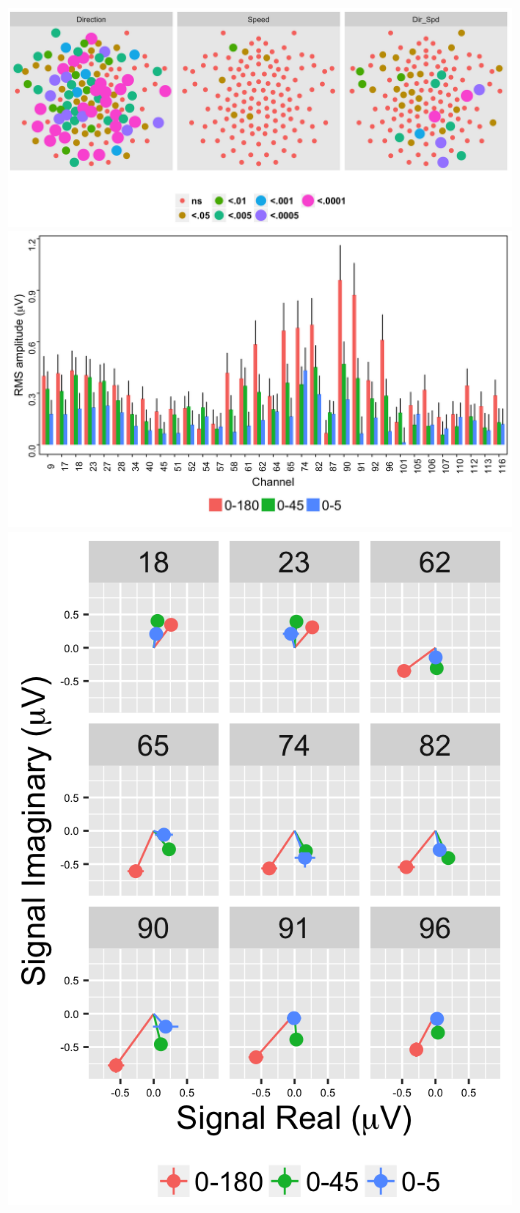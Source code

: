 \documentclass[landscape,final,paperwidth=72in,paperheight=40.5in,fontscale=0.285]{baposter}
\begin{document}
\begin{poster}
{\begin{center}
  \includegraphics[scale=0.25,valign=t]{../../figs/3F1-analyze-and-plot-main-effects-1.png}
  \hfill
  \includegraphics[scale=0.18,valign=t]{../../figs/3F1-plot-channel-effects-1.png}
  \hfill
  \includegraphics[scale=0.18,valign=t]{../../figs/3F1-plot-vector-avg-1.png}
\end{center}

}
\end{poster}
\end{document}
